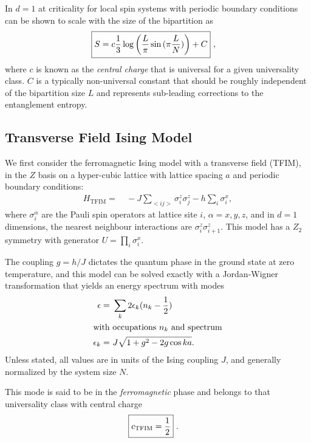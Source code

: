 \documentclass[12pt]{article}{}
\begin{document}
In $d=1$ at criticality for local spin systems with periodic boundary conditions can be shown \cite{Cole2017,Abanin2018} to scale with the size of the bipartition as
\begin{align}
  \Aboxed{S = c \frac{1}{3}\log{\left(\frac{L}{\pi} \sin{(\pi \frac{L}{N})}\right)} + C}~, \label{eq:entropy_scaling}
\end{align}
where $c$ is known as the \emph{central charge} that is universal for a given universality class. $C$ is a typically non-universal constant that should be roughly independent of the bipartition size $L$ and represents sub-leading corrections to the entanglement entropy.


\subsection*{\small Transverse Field Ising Model}
We first consider the ferromagnetic Ising model with a transverse field (TFIM), in the $Z$ basis on a hyper-cubic lattice with lattice spacing $a$ and periodic boundary conditions:
\begin{align}
  H_{\textrm{TFIM}} =&~ -J \sum_{<ij>} \sigma^{z}_{i} \sigma^{z}_{j} - h \sum_{i} \sigma^{x}_{i}, \label{eq:ising_hamiltonian}
\end{align}
where $\sigma^{\alpha}_{i}$ are the Pauli spin operators at lattice site $i$, $\alpha = x,y,z$, and in $d=1$ dimensions, the nearest neighbour interactions are $\sigma^{z}_{i}\sigma^{z}_{i+1}$. This model has a $Z_2$ symmetry with generator $U = \prod_{i}\sigma^{x}_i$.

The coupling $g = h/J$ dictates the quantum phase in the ground state at zero temperature, and this model can be solved exactly with a Jordan-Wigner transformation \cite{Lieb1961} that yields an energy spectrum with modes
\begin{align}
  \epsilon = &~ \sum_{k} 2\epsilon_{k}(n_k - \frac{1}{2}) \\
  \intertext{with occupations $n_k$ and spectrum}
  \epsilon_{k} = &~ J \sqrt{1 + g^2 - 2g\cos{ka}}.
\end{align}
Unless stated, all values are in units of the Ising coupling $J$, and generally normalized by the system size $N$.

This mode is said to be in the \emph{ferromagnetic} phase and belongs to that universality class with central charge
\begin{align}
  \Aboxed{c_{\textrm{TFIM}} = \frac{1}{2}}~.
\end{align}
\end{document}
